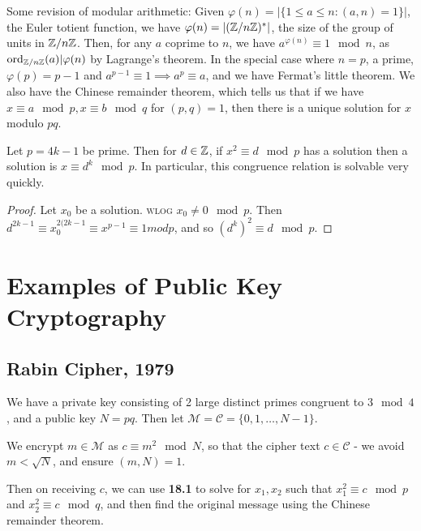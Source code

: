 \documentclass[10pt,a4paper]{article}
\begin{document}
Some revision of modular arithmetic: Given $\varphi(n) = |\{1 \leq a \leq n : (a,n) = 1\}|$, the Euler totient function, we have $\varphi(n) = |(\mathbb{Z}/n\mathbb{Z})^\ast|$, the size of the group of units in $\mathbb{Z}/n\mathbb{Z}$. Then, for any $a$ coprime to $n$, we have $a^{\varphi(n)} \equiv 1 \mod n$, as $\operatorname{ord}_{\mathbb{Z}/n\mathbb{Z}}(a)|\varphi(n)$ by Lagrange's theorem. In the special case where $n = p$, a prime, $\varphi(p) = p-1$ and $a^{p-1} \equiv 1 \implies a^p \equiv a$, and we have Fermat's little theorem. We also have the Chinese remainder theorem, which tells us that if we have $x \equiv a \mod p, x \equiv b \mod q$ for $(p,q) = 1$, then there is a unique solution for $x$ modulo $pq$.

\begin{lemma}
Let $p = 4k-1$ be prime. Then for $d \in \mathbb{Z}$, if $x^2 \equiv d \mod p$ has a solution then a solution is $x \equiv d^k \mod p$. In particular, this congruence relation is solvable very quickly.
\end{lemma}
\begin{proof}
Let $x_0$ be a solution. \textsc{wlog} $x_0 \neq 0 \mod p$. Then $d^{2k-1} \equiv x_0^{2(2k-1} \equiv x^{p-1} \equiv 1 mod p$, and so $(d^k)^2 \equiv d \mod p$.
\end{proof}
\section{Examples of Public Key Cryptography}
\subsection{Rabin Cipher, 1979}
We have a private key consisting of 2 large distinct primes congruent to $3 \mod 4$, and a public key $N = pq$. Then let $\mathcal{M} = \mathcal{C} = \{0,1, \ldots, N-1\}$.

We encrypt $m \in \mathcal{M}$ as $c \equiv m^2 \mod N$, so that the cipher text $c \in \mathcal{C}$ - we avoid $m < \sqrt{N}$, and ensure $(m,N) = 1$. 

Then on receiving $c$, we can use \textbf{18.1} to solve for $x_1, x_2$ such that $x_1^2 \equiv c \mod p$ and $x_2^2 \equiv c \mod q$, and then find the original message using the Chinese remainder theorem.
\end{document}
